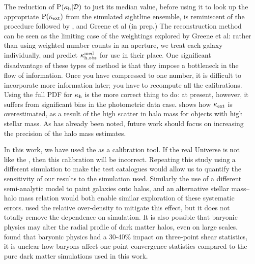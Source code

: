 \documentclass[useAMS,usenatbib]{mn2e}
\begin{document}
The reduction of ${\rm P}(\kappa_{\rm h}|{\mathcal{D}})$ to just its median value, before using
it to look up the appropriate ${\rm P}(\kappa_{\rm ext})$ from the simulated sightline
ensemble, is reminiscent of the procedure followed by \citet{SuyuEtal2010},
and Greene et al (in prep.) The reconstruction method can be seen as the
limiting case of the weightings explored by Greene et al: rather than using
weighted number counts in an aperture, we treat each galaxy individually, and
predict  $\kappa_{\rm h,obs}^{\rm med}$ for use in their place. One
significant disadvantage of these types of method is that they impose a
bottleneck in the flow of information. Once you have compressed to one number,
it is difficult to incorporate more information later; you have to recompute
all the calibrations. Using the full PDF for $\kappa_{\rm h}$ is the more correct
thing to do: at present, however, it suffers from significant bias in the
photometric data case.  shows how $\kappa_{\rm ext}$ is
overestimated, as a result of the high scatter in halo mass for objects with 
high stellar mass. As has already been noted, 
future work should focus on increasing the precision of the halo
mass estimates. 

In this work, we have used 
the \MS as a calibration tool. If the real Universe is not
like the \MS, then this calibration will be incorrect. Repeating this 
study using
a different simulation to make the test catalogues would allow us to quantify
the sensitivity of our results to the simulation used. Similarly the use of a
different semi-analytic model to paint galaxies onto halos, and an alternative
stellar mass--halo mass relation would both enable similar exploration of
these systematic errors. \citet{SuyuEtal2010} used the relative over-density to mitigate this
effect, but it does not totally remove the dependence on simulation.
It is also possible that baryonic physics may alter   
the radial profile of dark matter halos, even on large scales. \citet{Semboloni+2012}
found that baryonic physics had a 30-40\% impact on three-point shear statistics, it is
unclear how baryons affect one-point convergence statistics compared to the pure dark matter
simulations used in this work.
\end{document}
